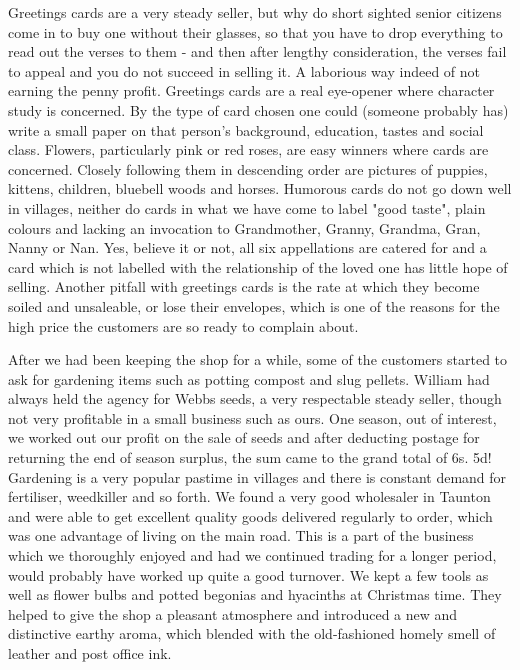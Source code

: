 Greetings cards are a very steady seller, but why do short sighted senior citizens come in to buy one without their glasses, so that you have to drop everything to read out the verses to them - and then after lengthy consideration, the verses fail to appeal and you do not succeed in selling it. A laborious way indeed of not earning the penny profit. Greetings cards are a real eye-opener where character study is concerned. By the type of card chosen one could (someone probably has) write a small paper on that person's background, education, tastes and social class. Flowers, particularly pink or red roses, are easy winners where cards are concerned. Closely following them in descending order are pictures of puppies, kittens, children, bluebell woods and horses. Humorous cards do not go down well in villages, neither do cards in what we have come to label "good taste", plain colours and lacking an invocation to Grandmother, Granny, Grandma, Gran, Nanny or Nan. Yes, believe it or not, all six appellations are catered for and a card which is not labelled with the relationship of the loved one has little hope of selling. Another pitfall with greetings cards is the rate at which they become soiled and unsaleable, or lose their envelopes, which is one of the reasons for the high price the customers are so ready to complain about.

After we had been keeping the shop for a while, some of the customers started to ask for gardening items such as potting compost and slug pellets. William had always held the agency for Webbs seeds, a very respectable steady seller, though not very profitable in a small business such as ours. One season, out of interest, we worked out our profit on the sale of seeds and after deducting postage for returning the end of season surplus, the sum came to the grand total of 6s. 5d! Gardening is a very popular pastime in villages and there is constant demand for fertiliser, weedkiller and so forth. We found a very good wholesaler in Taunton and were able to get excellent quality goods delivered regularly to order, which was one advantage of living on the main road. This is a part of the business which we thoroughly enjoyed and had we continued trading for a longer period, would probably have worked up quite a good turnover. We kept a few tools as well as flower bulbs and potted begonias and hyacinths at Christmas time. They helped to give the shop a pleasant atmosphere and introduced a new and distinctive earthy aroma, which blended with the old-fashioned homely smell of leather and post office ink.

